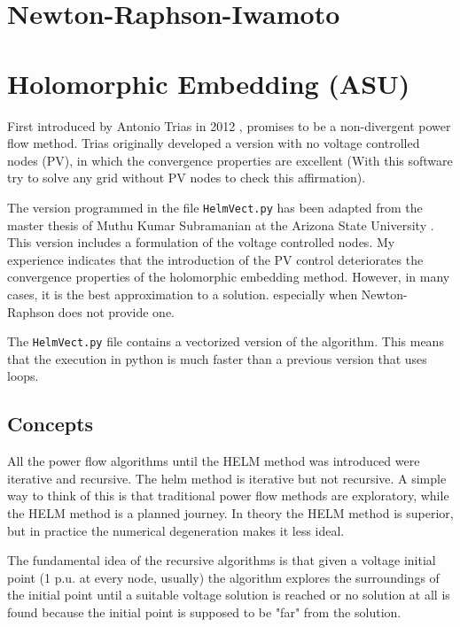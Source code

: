 \documentclass[11pt,fleqn]{book} %
\begin{document}
\section{Newton-Raphson-Iwamoto}


\newpage
\section{Holomorphic Embedding (ASU)}

First introduced by Antonio Trias in 2012 \cite{TriasHELM}, promises to be a non-divergent power flow method. Trias originally developed a version with no voltage controlled nodes (PV), in which the convergence properties are excellent (With this software try to solve any grid without PV nodes to check this affirmation). 

The version programmed in the file \verb|HelmVect.py| has been adapted from the master thesis of Muthu Kumar Subramanian at the Arizona State University \cite{subramanian2014application}. This version includes a formulation of the voltage controlled nodes. My experience indicates that the introduction of the PV control deteriorates the convergence properties of the holomorphic embedding method. However, in many cases, it is the best approximation to a solution. especially when Newton-Raphson does not provide one.

The \verb|HelmVect.py|  file contains a vectorized version of the algorithm. This means that the execution in python is much faster than a previous version that uses loops.

\subsection{Concepts}

All the power flow algorithms until the HELM method was introduced were iterative and recursive. The helm method is iterative but not recursive. A simple way to think of this is that traditional power flow methods are exploratory, while the HELM method is a planned journey. In theory the HELM method is superior, but in practice the numerical degeneration makes it less ideal.

The fundamental idea of the recursive algorithms is that given a voltage initial point (1 p.u. at every node, usually) the algorithm explores the surroundings of the initial point until a suitable voltage solution is reached or no solution at all is found because the initial point is supposed to be "far" from the solution.
\end{document}
